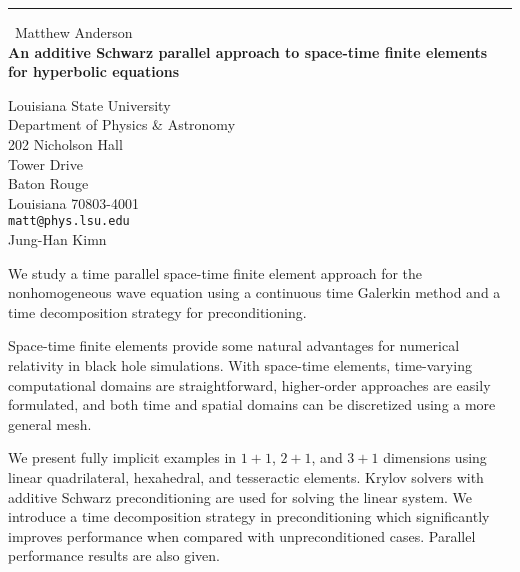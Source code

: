 \documentclass{report}
\begin{document}
\begin{center}
\rule{6in}{1pt} \
{\large Matthew Anderson \\
{\bf An additive Schwarz parallel approach to space-time finite elements for hyperbolic equations }}

Louisiana State University \\ Department of Physics & Astronomy \\ 202 Nicholson Hall \\ Tower Drive \\ Baton Rouge \\ Louisiana 70803-4001
\\
{\tt matt@phys.lsu.edu}\\
Jung-Han Kimn\\
	
	\end{center}

We study a time parallel space-time finite element approach
for the nonhomogeneous wave equation using a continuous time Galerkin
method and a time decomposition strategy for preconditioning.

Space-time finite elements provide some natural
advantages for numerical relativity in black hole simulations.
With space-time elements, time-varying computational
domains are straightforward, higher-order approaches
are easily formulated, and both time and spatial domains can be
discretized using a more general mesh.

We present fully implicit examples in $1+1$, $2+1$, and $3+1$ dimensions
using linear quadrilateral, hexahedral, and tesseractic elements. Krylov
solvers with additive Schwarz preconditioning are
used for solving the linear system. We introduce a time decomposition
strategy in preconditioning which significantly improves performance when
compared with unpreconditioned cases. Parallel performance results are
also given.
\end{document}
